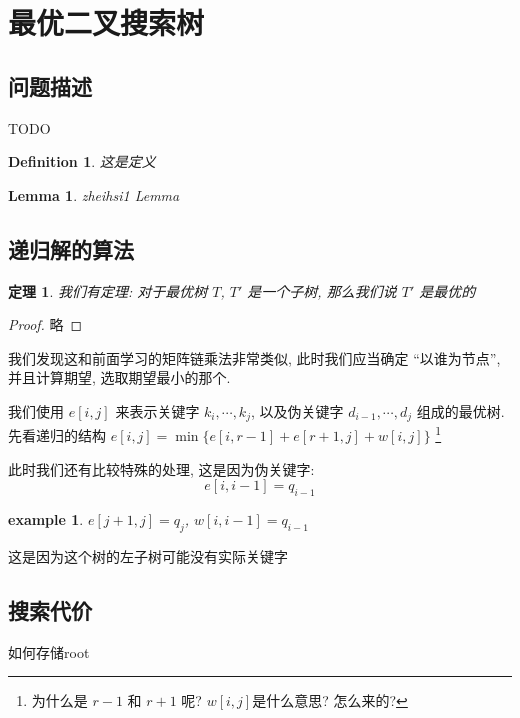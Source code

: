 \documentclass[a4paper, 10pt]{ctexart} %
\newtheorem{theorem}{定理}
\newtheorem{example}{example}
\newtheorem{definition}{Definition}
\newtheorem{lemma}{Lemma}
\begin{document}
\section{最优二叉搜索树}
\subsection{问题描述}
TODO
\begin{definition}
    这是定义    
\end{definition}
\begin{lemma}
    zheihsi1 Lemma
\end{lemma}
\subsection{递归解的算法}
\begin{theorem}
我们有定理: 对于最优树 $T$, $T'$ 是一个子树, 那么我们说 $T'$ 是最优的
\end{theorem}
\begin{proof}
    略  
\end{proof}

我们发现这和前面学习的矩阵链乘法非常类似, 此时我们应当确定 ``以谁为节点'', 并且计算期望, 选取期望最小的那个.

我们使用 $e \left[ i,j \right]$ 来表示关键字 $k_i , \cdots  , k_j$, 以及伪关键字 $d_{i-1}, \cdots  , d_{j}$ 组成的最优树. 
先看递归的结构 
$e \left[ i, j  \right] = \min \{e\left[ i,r-1 \right] + e \left[ r+1 ,j\right] +w \left[ i, j \right]\}$
\footnote{为什么是 $r-1$ 和 $r+1$ 呢? $w\left[ i,j  \right]$是什么意思? 怎么来的?}

此时我们还有比较特殊的处理, 这是因为伪关键字: 
\[
e \left[ i, i -1 \right]= q _{i-1}
\]
\begin{example}
    $e\left[ j+1,j \right] = q_{j}$, $w [ i, i-1] = q_{i-1}$ 
\end{example}
这是因为这个树的左子树可能没有实际关键字

\subsection{搜索代价}
如何存储root
\end{document}
